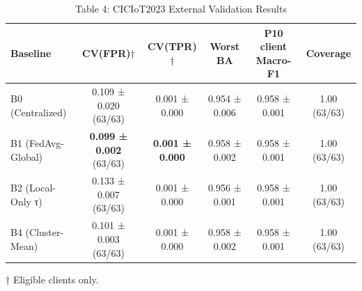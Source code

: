 \begin{table}[htbp]
\caption{Table 4: CICIoT2023 External Validation Results}
\centering
\begin{tabular}{l c c c c c}
\toprule
Baseline & CV(FPR)$\dagger$ & CV(TPR)$\dagger$ & Worst BA & P10 client Macro-F1 & Coverage \\
\midrule
B0 (Centralized) & 0.109 ± 0.020 (63/63) & 0.001 ± 0.000 & 0.954 ± 0.006 & 0.958 ± 0.001 & 1.00 (63/63) \\
B1 (FedAvg-Global) & \textbf{0.099 ± 0.002} (63/63) & \textbf{0.001 ± 0.000} & 0.958 ± 0.002 & 0.958 ± 0.001 & 1.00 (63/63) \\
B2 (Local-Only τ) & 0.133 ± 0.007 (63/63) & 0.001 ± 0.000 & 0.956 ± 0.001 & 0.958 ± 0.001 & 1.00 (63/63) \\
B4 (Cluster-Mean) & 0.101 ± 0.003 (63/63) & 0.001 ± 0.000 & 0.958 ± 0.002 & 0.958 ± 0.001 & 1.00 (63/63) \\
\bottomrule
\end{tabular}

\footnotesize{† Eligible clients only.}

\end{table}
